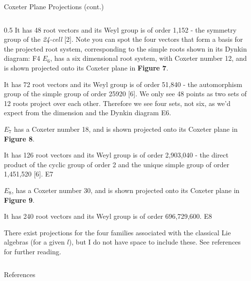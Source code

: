\documentclass[final]{beamer}
\newlength{\colwidth}
\begin{document}
\begin{frame}[t]
\begin{columns}[t]
\begin{column}{\colwidth}
\begin{block}{Coxeter Plane Projections (cont.)}
\begin{minipage}{\colwidth}
\begin{columns}[t]
\begin{column}{0.5\colwidth}
It has 48 root vectors and its Weyl group is of order 1,152 - the symmetry group of the \emph{24-cell} [2]. Note you can spot the four vectors that form a basis for the projected root system, corresponding to the simple roots shown in its Dynkin diagram: \dynkin F4
\vspace{1cm}
$E_{6}$, has a six dimensional root system, with Coxeter number 12, and is shown projected onto its Coxeter plane in \textbf{Figure 7}.

It has 72 root vectors and its Weyl group is of order 51,840 -  the automorphism group of the simple group of order 25920 [6]. We only see 48 points as two sets of 12 roots project over each other. Therefore we see four sets, not six, as we'd expect from the dimension and the Dynkin diagram \dynkin E6.

\vspace{1cm}
$E_{7}$ has a Coxeter number 18, and is shown projected onto its Coxeter plane in \textbf{Figure 8}.

It has 126 root vectors and its Weyl group is of order 2,903,040 -  the direct product of the cyclic group of order 2 and the unique simple group of order 1,451,520 [6]. \dynkin E7

\vspace{1cm}
$E_{8}$, has a Coxeter number 30, and is shown projected onto its Coxeter plane in \textbf{Figure 9}.

It has 240 root vectors and its Weyl group is of order 696,729,600. \dynkin E8

\vspace{1cm}
There exist projections for the four families associated with the classical Lie algebras (for a given $l$), but I do not have space to include these. See references for further reading.

\vspace{1cm}

\end{column}
\end{columns}
\end{minipage}
\end{block}

\begin{block}{References}
\nocite{*}
\footnotesize{}
\end{block}
\end{column}


\end{columns}
\end{frame}
\end{document}
